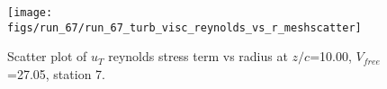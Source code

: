 \begin{figure}[H]
\centering
\texttt{[image: figs/run\_67/run\_67\_turb\_visc\_reynolds\_vs\_r\_meshscatter]}
\caption{Scatter plot of $
u_T$ reynolds stress term vs radius at $z/c$=10.00, $V_{free}$=27.05, station 7.}
\label{fig:run_67_turb_visc_reynolds_vs_r_meshscatter}
\end{figure}


